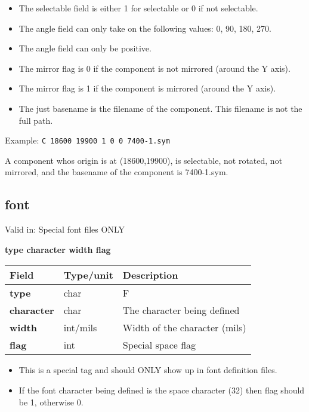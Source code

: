 \documentclass{article}
\begin{document}
\begin{itemize}
\item The selectable field is either 1 for selectable or 0 if not selectable.
\item The angle field can only take on the following values: 0, 90, 180, 270.
\item The angle field can only be positive.
\item The mirror flag is 0 if the component is not mirrored (around the Y axis).
\item The mirror flag is 1 if the component is mirrored (around the Y axis).
\item The just basename is the filename of the component.  This filename is 
      not the full path. 
\end{itemize}

Example:\newline
{\tt C 18600 19900 1 0 0 7400-1.sym}

A component whos origin is at (18600,19900), is selectable, not rotated, not
mirrored, and the basename of the component is 7400-1.sym.


\subsection{font}

Valid in: Special font files ONLY

{\bf type character width flag}

\begin{table}[h]
\begin{tabular}{|l|l|l|} \hline
Field 		& Type/unit 	& Description \\ \hline 
\hline
{\bf type} 	& char 		& F \\ \hline
{\bf character} & char		& The character being defined \\ \hline
{\bf width} 	& int/mils	& Width of the character (mils)  \\ \hline
{\bf flag} 	& int		& Special space flag \\ \hline
\end{tabular}
\end{table}

\begin{itemize}
\item This is a special tag and should ONLY show up in font definition files.
\item If the font character being defined is the space character (32) then 
      flag should be 1, otherwise 0.
\end{itemize}
\end{document}
